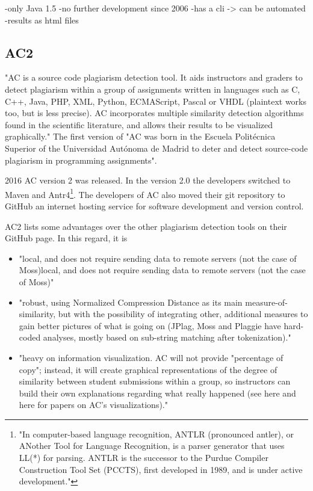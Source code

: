 \documentclass[a4paper, 11pt]{article}
\renewcommand{\\}{\vspace*{0.5\baselineskip} \newline}
\begin{document}
-only Java 1.5\autocite{PLAGGIE,RMP}
-no further development since 2006
-has a cli -> can be automated
-results as html files

\newpage

\subsection{AC2}

"AC is a source code plagiarism detection tool. It aids instructors and graders to detect plagiarism within a group of assignments written in languages such as C, C++, Java, PHP, XML, Python, ECMAScript, Pascal or VHDL (plaintext works too, but is less precise). AC incorporates multiple similarity detection algorithms found in the scientific literature, and allows their results to be visualized graphically." \autocite{AC2} The first version of "AC was born in the Escuela Politécnica Superior of the Universidad Autónoma de Madrid to deter and detect source-code plagiarism in programming assignments". \autocite{AC2}

2016 AC version 2 was released. In the version 2.0 the developers switched to Maven and Antr4\footnote{\label{footnoteAntlr}"In computer-based language recognition, ANTLR (pronounced antler), or ANother Tool for Language Recognition, is a parser generator that uses LL(*) for parsing. ANTLR is the successor to the Purdue Compiler Construction Tool Set (PCCTS), first developed in 1989, and is under active development."\autocite{enwiki:1115716413}}. The developers of AC also moved their git repository to GitHub an internet hosting service for software development and version control.

AC2 lists some advantages over the other plagiarism detection tools on their GitHub page. In this regard, it is

\begin{itemize}
	\item "local, and does not require sending data to remote servers (not the case of Moss)local, and does not require sending data to remote servers (not the case of Moss)"
	\item "robust, using Normalized Compression Distance as its main measure-of-similarity, but with the possibility of integrating other, additional measures to gain better pictures of what is going on (JPlag, Moss and Plaggie have hard-coded analyses, mostly based on sub-string matching after tokenization)."
	\item "heavy on information visualization. AC will not provide "percentage of copy"; instead, it will create graphical representations of the degree of similarity between student submissions within a group, so instructors can build their own explanations regarding what really happened (see here and here for papers on AC's visualizations)."
\end{itemize}\autocite{AC2}
\end{document}
